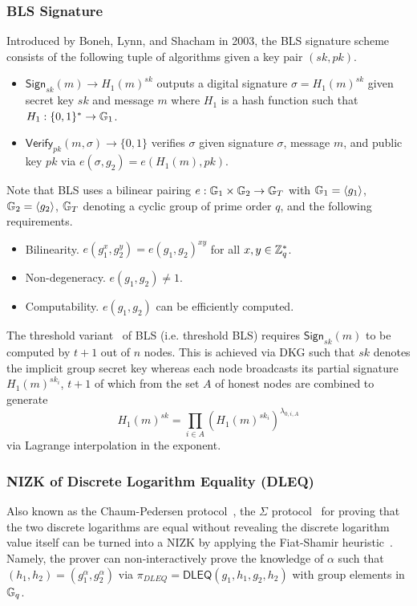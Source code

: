 \subsubsection{BLS Signature}
\label{appendix:bls}
Introduced by Boneh, Lynn, and Shacham in 2003, the BLS signature scheme~\cite{boneh2001short} consists of the following tuple of algorithms given a key pair $(sk, pk)$.
\begin{itemize}
\item $\mathsf{Sign}_{sk}(m) \rightarrow H_1(m)^{sk}$ outputs a digital signature $\sigma = H_1(m)^{sk}$ given secret key $sk$ and message $m$ where $H_1$ is a hash function such that $H_1: \{0, 1\}^* \rightarrow \mathbb{G}_1$.
\item $\mathsf{Verify}_{pk}(m, \sigma) \rightarrow \{0, 1\}$ verifies $\sigma$ given signature $\sigma$, message $m$, and public key $pk$ via $e(\sigma, g_2) = e(H_1(m), pk)$.
\end{itemize}
Note that BLS uses a bilinear pairing $e: \mathbb{G}_1 \times \mathbb{G}_2 \rightarrow \mathbb{G}_T$ with $\mathbb{G}_1 = \langle g_1 \rangle$, $\mathbb{G}_2 = \langle g_2 \rangle$, $\mathbb{G}_T$ denoting a cyclic group of prime order $q$, and the following requirements.
\begin{itemize}
\item Bilinearity. $e(g_1^x, g_2^y) = e(g_1, g_2)^{x y}$ for all $x, y \in \mathbb{Z}^*_q$.
\item Non-degeneracy. $e(g_1, g_2) \neq 1$.
\item Computability. $e(g_1, g_2)$ can be efficiently computed.
\end{itemize}

The threshold variant~\cite{boldyreva2003threshold} of BLS (i.e. threshold BLS) requires $\mathsf{Sign}_{sk}(m)$ to be computed by $t + 1$ out of $n$ nodes. This is achieved via DKG such that $sk$ denotes the implicit group secret key whereas each node broadcasts its partial signature $H_1(m)^{sk_i}$, $t + 1$ of which from the set $A$ of honest nodes are combined to generate
\[
H_1(m)^{sk} = \prod_{i \in A} \left(H_1(m)^{sk_i}\right)^{\lambda_{0, i, A}}
\]
via Lagrange interpolation in the exponent.

\subsubsection{NIZK of Discrete Logarithm Equality (DLEQ)}
\label{appendix:dleq}
Also known as the Chaum-Pedersen protocol~\cite{chaum1992wallet}, the $\Sigma$ protocol~\cite{damgaard2002sigma} for proving that the two discrete logarithms are equal without revealing the discrete logarithm value itself can be turned into a NIZK by applying the Fiat-Shamir heuristic~\cite{fiat1986prove}. Namely, the prover can non-interactively prove the knowledge of $\alpha$ such that $(h_1, h_2) = (g_1^\alpha, g_2^\alpha)$ via $\pi_{DLEQ} = \mathsf{DLEQ}(g_1, h_1, g_2, h_2)$ with group elements in $\mathbb{G}_q$.\\

